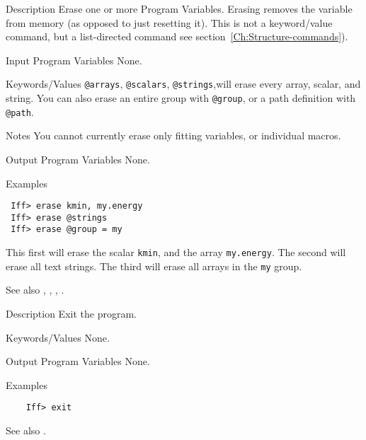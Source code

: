 \begin{IFFcom}
\item[Description] Erase one or more Program Variables.  Erasing removes
  the variable from memory (as opposed to just resetting it).  This is not
  a keyword/value command, but a list-directed command see
  section~\ref{Ch:Structure-commands}).
\item[Input Program Variables] None.
\item[Keywords/Values] {\texttt{@arrays}}, {\texttt{@scalars}},
  {\texttt{@strings}},will erase every array, scalar, and string.  You can
  also erase an entire group with {\texttt{@group}}, or a path definition with
  {\texttt{@path}}.
\item[Notes] You cannot currently erase only fitting variables, or individual
  macros.  
\item[Output Program Variables] None.
\item[Examples] {\hspace{1.in} \vspace{-0.1truein} \relax }
\begin{verbatim}
 Iff> erase kmin, my.energy
 Iff> erase @strings
 Iff> erase @group = my
\end{verbatim}
  \noindent
  This first will erase the scalar {\texttt{kmin}}, and the array
  {\texttt{my.energy}}.  The second will erase all text strings. The third
  will erase all arrays in the {\tt{my}} group.
\item[See also] {}, {},
  {}, {}.
\end{IFFcom}



\begin{IFFcom}
\item[Description] Exit the program.
\item[Keywords/Values] None.
\item[Output Program Variables] None.
\item[Examples] {\hspace{1.in} \vspace{-0.1truein} \relax }
\begin{verbatim} 
    Iff> exit
\end{verbatim}
\item[See also] {}.
\end{IFFcom}



